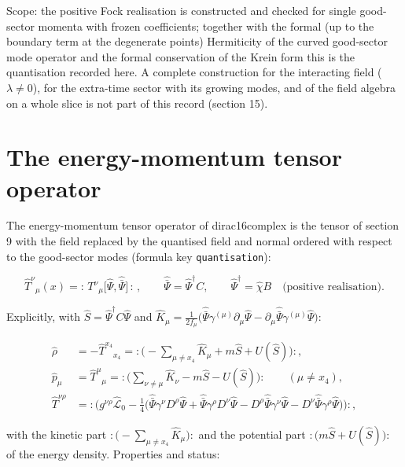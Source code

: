 \documentclass[11pt]{article}
\begin{document}
Scope: the positive Fock realisation is constructed and checked for single good-sector momenta with frozen coefficients; together with the formal (up to the boundary term at the degenerate points) Hermiticity of the curved good-sector mode operator and the formal conservation of the Krein form this is the quantisation recorded here. A complete construction for the interacting field ($\lambda \neq 0$), for the extra-time sector with its growing modes, and of the field algebra on a whole slice is not part of this record (section 15).

\section{The energy-momentum tensor operator}

The energy-momentum tensor operator of dirac16complex is the tensor of section 9 with the field replaced by the quantised field and normal ordered with respect to the good-sector modes (formula key \texttt{quantisa\allowbreak{}tion}):

\[
\hat T^\nu{}_\mu(x) = {:}\,T^\nu{}_\mu\big[\hat\Psi, \hat{\bar\Psi}\big]\,{:}\,,\qquad \hat{\bar\Psi} = \hat\Psi^\dagger C,\qquad \hat\Psi^\dagger = \hat\chi B \quad\text{(positive realisation)} .
\]

Explicitly, with $\hat S = \hat\Psi^\dagger C\hat\Psi$ and $\hat K_\mu = \frac{1}{2f_\mu}\big(\hat{\bar\Psi}\gamma^{(\mu)}\partial_\mu\hat\Psi - \partial_\mu\hat{\bar\Psi}\gamma^{(\mu)}\hat\Psi\big)$:

\[
\begin{aligned}
\hat\rho &= -\hat T^{x_4}{}_{x_4} = {:}\Big(-\sum_{\mu\neq x_4}\hat K_\mu + m\hat S + U(\hat S)\Big){:}, \\
\hat p_\mu &= \hat T^\mu{}_\mu = {:}\Big(\sum_{\nu\neq\mu}\hat K_\nu - m\hat S - U(\hat S)\Big){:} \qquad (\mu \neq x_4), \\
\hat T^{\nu\rho} &= {:}\Big(g^{\nu\rho}\hat{\mathcal{L}}_0 - \tfrac14\big(\hat{\bar\Psi}\gamma^\nu D^\rho\hat\Psi + \hat{\bar\Psi}\gamma^\rho D^\nu\hat\Psi - D^\rho\hat{\bar\Psi}\gamma^\nu\hat\Psi - D^\nu\hat{\bar\Psi}\gamma^\rho\hat\Psi\big)\Big){:},
\end{aligned}
\]

with the kinetic part ${:}\big(-\sum_{\mu\neq x_4}\hat K_\mu\big){:}$ and the potential part ${:}\big(m\hat S + U(\hat S)\big){:}$ of the energy density. Properties and status:
\end{document}
